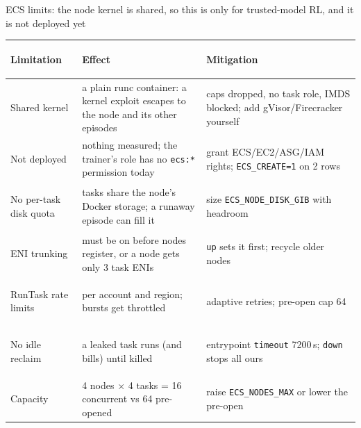 \begin{frame}{ECS limits: the node kernel is shared, so this is only for trusted-model RL, and it is not deployed yet}
\scriptsize
\begin{tabularx}{\textwidth}{@{}>{\bfseries\raggedright\arraybackslash}p{2.6cm}XX@{}}
\toprule
Limitation & Effect & Mitigation\\
\midrule
Shared kernel & a plain runc container: a kernel exploit escapes to the node and its other episodes & caps dropped, no task role, IMDS blocked; add gVisor/Firecracker yourself\\
Not deployed & nothing measured; the trainer's role has no \texttt{ecs:*} permission today & grant ECS/EC2/ASG/IAM rights; \texttt{ECS\_CREATE=1} on 2 rows\\
No per-task disk quota & tasks share the node's Docker storage; a runaway episode can fill it & size \texttt{ECS\_NODE\_DISK\_GIB} with headroom\\
ENI trunking & must be on before nodes register, or a node gets only 3 task ENIs & \texttt{up} sets it first; recycle older nodes\\
RunTask rate limits & per account and region; bursts get throttled & adaptive retries; pre-open cap 64\\
No idle reclaim & a leaked task runs (and bills) until killed & entrypoint \texttt{timeout} 7200\,s; \texttt{down} stops all ours\\
Capacity & 4 nodes $\times$ 4 tasks = 16 concurrent vs 64 pre-opened & raise \texttt{ECS\_NODES\_MAX} or lower the pre-open\\
\bottomrule
\end{tabularx}
\end{frame}

